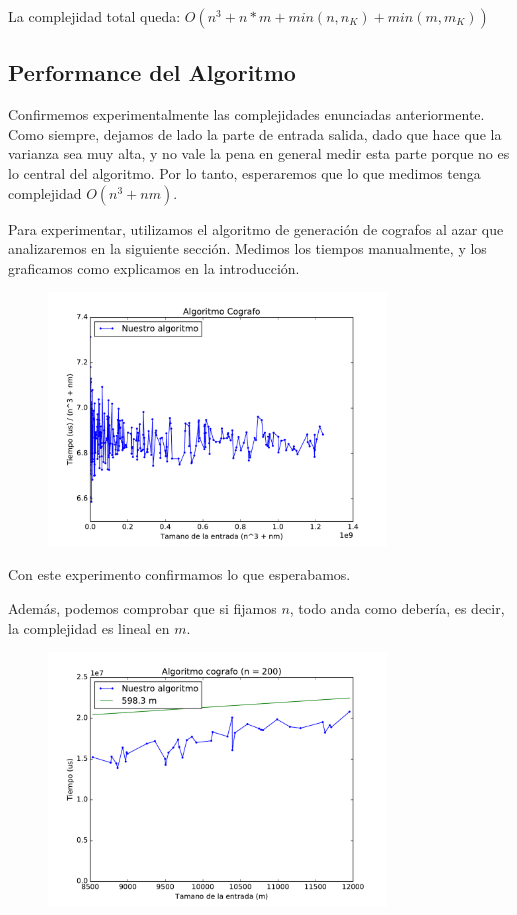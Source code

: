 La complejidad total queda: 
$O( n^3 + n*m + min( n, n_K) + min (m, m_K) )$

\subsection{Performance del Algoritmo}

Confirmemos experimentalmente las complejidades enunciadas anteriormente. Como siempre, dejamos de lado la parte de entrada salida, dado que hace que la varianza sea muy alta, y no vale la pena en general medir esta parte porque no es lo central del algoritmo. Por lo tanto, esperaremos que lo que medimos tenga complejidad $O(n^3 + nm)$. 

Para experimentar, utilizamos el algoritmo de generación de cografos al azar que analizaremos en la siguiente sección. Medimos los tiempos manualmente, y los graficamos como explicamos en la introducción. 

\begin{figure}[H]
 \centering
	\includegraphics[width=0.8\textwidth]{graficos/problema_3/tiempos0.pdf}
	\caption{}
	\label{fig:problema3-tiempos0}
\end{figure}

Con este experimento confirmamos lo que esperabamos.

Además, podemos comprobar que si fijamos $n$, todo anda como debería, es decir, la complejidad es lineal en $m$.

\begin{figure}[H]
 \centering
	\includegraphics[width=0.8\textwidth]{graficos/problema_3/tiempos1.pdf}
	\caption{}
	\label{fig:problema3-tiempos1}
\end{figure}

